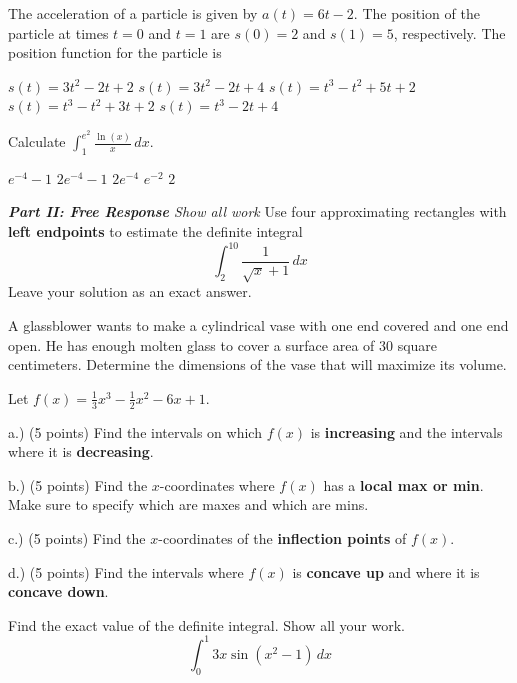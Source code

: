 \documentclass[11pt]{article}
\begin{document}
\begin{questions}
\begin{multiplechoice}{5}
\question The acceleration of a particle is given by $a(t) = 6t - 2$.  The position
of the particle at times $t = 0$ and $t = 1$ are $s(0) = 2$ and $s(1) = 5$, respectively.  
The position function for the particle is
\begin{answers}{2}
\ans $s(t) = 3t^2 - 2t + 2$
\ans $s(t) = 3t^2 - 2t + 4$
\ans $s(t) = t^3 - t^2 + 5t + 2$
\ans $s(t) = t^3 - t^2 + 3t + 2$
\ans $s(t) = t^3 - 2t + 4$
\end{answers}

\question Calculate $\int_1^{e^2} \frac{\ln(x)}{x} \, dx$.
\begin{answers}{2}
\ans $e^{-4} - 1$ 
\ans $2e^{-4} - 1$
\ans $2e^{-4}$
\ans $e^{-2}$
\ans $2$
\end{answers}

\end{multiplechoice}
\vspace{.2in}

\newpage

\noindent \emph{{\bf Part II: Free Response}{  Show all work}}
\question[10] Use four approximating rectangles with \textbf{left endpoints} to
estimate the definite integral
$$\int_2^{10} \frac{1}{\sqrt{x} + 1} \, dx$$
Leave your solution as an exact answer.


\newpage


\question[12] A glassblower wants to make a cylindrical vase with one end covered and one end open.  He has enough molten glass to cover a surface area of 30 square centimeters.  Determine the dimensions of the vase that will maximize its volume.

\newpage


\question[20]  Let $f(x) = \frac{1}{3}x^3 - \frac{1}{2}x^2 - 6x  + 1$.

a.) (5 points) Find the intervals on which $f(x)$ is
 \textbf{increasing} and the intervals where it is 
\textbf{decreasing}.

\vspace{2in}


b.) (5 points) Find the $x$-coordinates where $f(x)$
has a \textbf{local max or min}.  Make sure to
specify which are maxes and which are mins.

\vspace{2in}

c.) (5 points) Find the $x$-coordinates of the \textbf{inflection
points} of $f(x)$.

\vspace{2in}

d.)  (5 points) Find the intervals where
$f(x)$ is \textbf{concave up} and where it is
\textbf{concave down}.

\newpage

\question[10]  Find the exact value of the definite integral. Show all your work.
$$\int_0^1 3x \sin(x^2 -1) \, dx$$


\mbox{}
\end{questions}
\end{document}
